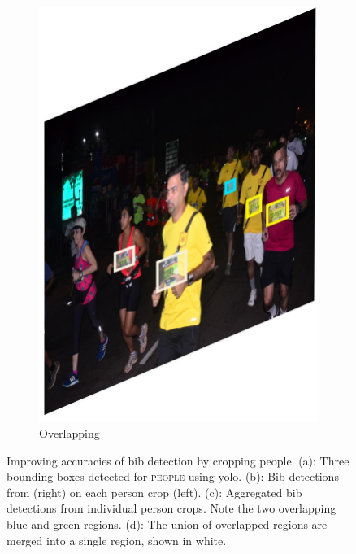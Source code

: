 \begin{landscape}
\begin{figure}[p]
\begin{subfigure}[b]{0.23\paperwidth}
      \includegraphics[width=\textwidth]{images/processing/yolo_crop_unioned_detections}
      \caption{Overlapping}
      \label{fig:processing_pipeline:person_filtering:yolo_crop_unioned_detections}
    \end{subfigure}
    \caption[Person filter using YOLO to improve accuracies of bib detection]{Improving accuracies of bib detection by cropping people. (a): Three bounding boxes detected for \textsc{people} using \gls{yolo}. (b): Bib detections from \frcnn{} (right) on each person crop (left). (c): Aggregated bib detections from individual person crops. Note the two overlapping blue and green regions. (d): The union of overlapped regions are merged into a single region, shown in white.}
    \label{fig:processing_pipeline:person_filtering}
  \end{figure}
\end{landscape}


